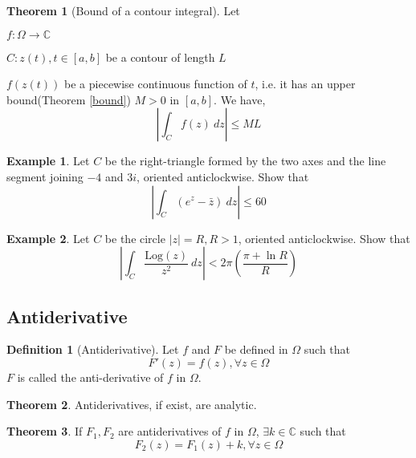 \documentclass[10pt, a4paper]{extarticle}
\theoremstyle{definition}
\newtheorem{thm}{Theorem}
\newtheorem{defn}{Definition}
\newtheorem{eg}{Example}
\begin{document}
	\begin{thm}[Bound of a contour integral]
		Let

		$f:\Omega\to\mathbb{C}$

		$C:z(t),t\in[a,b]$ be a contour of length $L$

		$f(z(t))$ be a piecewise continuous function of $t$, i.e. it has an upper bound(Theorem \ref{bound}) $M>0$ in $[a,b]$.
		We have,
		\[\left|\int_Cf(z)\ dz\right|\leq ML\]
	\end{thm}
	\begin{eg}
		Let $C$ be the right-triangle formed by the two axes and the line segment joining $-4$ and $3i$, oriented anticlockwise. Show that \[\left|\int_C (e^z-\bar{z})\ dz\right|\leq 60\]
	\end{eg}
	\begin{eg}
		Let $C$ be the circle $|z|=R,R>1$, oriented anticlockwise. Show that 
		\[\left|\int_C \frac{\text{Log}(z)}{z^2}\ dz\right|<2\pi\left(\frac{\pi+\ln R}{R}\right)\]
	\end{eg}

	\subsection{Antiderivative}
	\begin{defn}[Antiderivative]
	Let $f$ and $F$ be defined in $\Omega$ such that
	\[F'(z)=f(z),\forall z\in\Omega\]
	$F$ is called the anti-derivative of $f$ in $\Omega$.
	\end{defn}

	\begin{thm}
		Antiderivatives, if exist, are analytic.
	\end{thm}

	\begin{thm}
		If $F_1,F_2$ are antiderivatives of $f$ in $\Omega$, $\exists k\in\mathbb{C}$ such that
		\[F_2(z)=F_1(z)+k,\forall z\in\Omega\]
	\end{thm}
\end{document}
